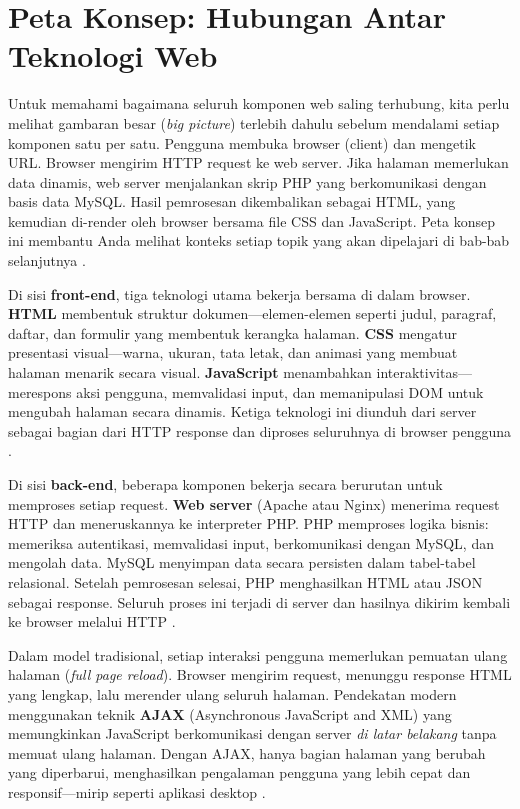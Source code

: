 \section{Peta Konsep: Hubungan Antar Teknologi Web}
Untuk memahami bagaimana seluruh komponen web saling terhubung, kita perlu melihat gambaran besar (\textit{big picture}) terlebih dahulu sebelum mendalami setiap komponen satu per satu. Pengguna membuka browser (client) dan mengetik URL. Browser mengirim HTTP request ke web server. Jika halaman memerlukan data dinamis, web server menjalankan skrip PHP yang berkomunikasi dengan basis data MySQL. Hasil pemrosesan dikembalikan sebagai HTML, yang kemudian di-render oleh browser bersama file CSS dan JavaScript. Peta konsep ini membantu Anda melihat konteks setiap topik yang akan dipelajari di bab-bab selanjutnya \cite{mdnLearn}.

Di sisi \textbf{front-end}, tiga teknologi utama bekerja bersama di dalam browser. \textbf{HTML} membentuk struktur dokumen---elemen-elemen seperti judul, paragraf, daftar, dan formulir yang membentuk kerangka halaman. \textbf{CSS} mengatur presentasi visual---warna, ukuran, tata letak, dan animasi yang membuat halaman menarik secara visual. \textbf{JavaScript} menambahkan interaktivitas---merespons aksi pengguna, memvalidasi input, dan memanipulasi DOM untuk mengubah halaman secara dinamis. Ketiga teknologi ini diunduh dari server sebagai bagian dari HTTP response dan diproses seluruhnya di browser pengguna \cite{mdnJsGuide}.

Di sisi \textbf{back-end}, beberapa komponen bekerja secara berurutan untuk memproses setiap request. \textbf{Web server} (Apache atau Nginx) menerima request HTTP dan meneruskannya ke interpreter PHP. PHP memproses logika bisnis: memeriksa autentikasi, memvalidasi input, berkomunikasi dengan MySQL, dan mengolah data. MySQL menyimpan data secara persisten dalam tabel-tabel relasional. Setelah pemrosesan selesai, PHP menghasilkan HTML atau JSON sebagai response. Seluruh proses ini terjadi di server dan hasilnya dikirim kembali ke browser melalui HTTP \cite{phpManual}.

Dalam model tradisional, setiap interaksi pengguna memerlukan pemuatan ulang halaman (\textit{full page reload}). Browser mengirim request, menunggu response HTML yang lengkap, lalu merender ulang seluruh halaman. Pendekatan modern menggunakan teknik \textbf{AJAX} (Asynchronous JavaScript and XML) yang memungkinkan JavaScript berkomunikasi dengan server \textit{di latar belakang} tanpa memuat ulang halaman. Dengan AJAX, hanya bagian halaman yang berubah yang diperbarui, menghasilkan pengalaman pengguna yang lebih cepat dan responsif---mirip seperti aplikasi desktop \cite{webdevLearn}.

